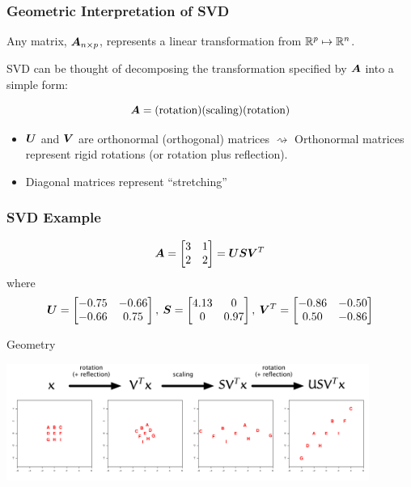 \documentclass{beamer}
\begin{document}
\begin{frame}
  \frametitle{Geometric Interpretation of SVD}

Any matrix, $\bm{A}_{n \times p}$, represents a linear transformation from $\mathbb{R}^p \mapsto  \mathbb{R}^n$. 

\medskip
SVD can be thought of decomposing the transformation specified by $\bm{A}$ into a simple form:

$$ \bm{A} = (\text{rotation})(\text{scaling)}(\text{rotation})$$

\begin{itemize}
\item $\bm{U}$ and $\bm{V}$ are orthonormal (orthogonal) matrices $\rightsquigarrow$ Orthonormal matrices represent rigid rotations (or rotation plus reflection).
\item Diagonal matrices represent ``stretching''
\end{itemize}


\end{frame}






\begin{frame}[fragile]
  \frametitle{SVD Example}

\[
\bm{A} =  \begin{bmatrix}3 & 1 \\ 2 & 2\end{bmatrix} = \bm{U} \bm{S} \bm{V}^T
\]
where
\[
\bm{U} = \begin{bmatrix} -0.75 & -0.66 \\ -0.66 & 0.75 \end{bmatrix}, \:
\bm{S} = \begin{bmatrix} 4.13 & 0 \\ 0 & 0.97 \end{bmatrix}, \:
\bm{V}^T = \begin{bmatrix} -0.86 & -0.50 \\ 0.50 & -0.86 \end{bmatrix}
\]

\medskip
\alert{Geometry}
\centerline{
\includegraphics[height=1.5in]{fig-svd-example}
}

\end{frame}
\end{document}
